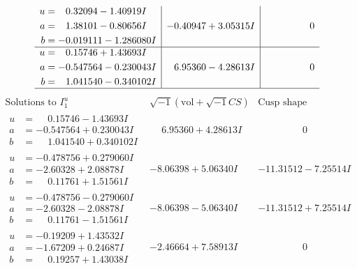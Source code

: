 \documentclass[1p]{elsarticle_modified}
\theoremstyle{definition}
\newcommand{\I}{\sqrt{-1}}
\begin{document}
$$\begin{array}{c|c|c}
\begin{aligned}
u &= \phantom{-}0.32094 - 1.40919 I \\
a &= \phantom{-}1.38101 - 0.80656 I \\
b &= -0.019111 - 1.286080 I\end{aligned}
 & -0.40947 + 3.05315 I & \phantom{-0.000000 } 0 \\ \hline\begin{aligned}
u &= \phantom{-}0.15746 + 1.43693 I \\
a &= -0.547564 - 0.230043 I \\
b &= \phantom{-}1.041540 - 0.340102 I\end{aligned}
 & \phantom{-}6.95360 - 4.28613 I & \phantom{-0.000000 } 0\\
 \hline 
 \end{array}$$\newpage$$\begin{array}{c|c|c}  
\text{Solutions to }I^u_{1}& \I (\text{vol} + \sqrt{-1}CS) & \text{Cusp shape}\\
 \hline 
\begin{aligned}
u &= \phantom{-}0.15746 - 1.43693 I \\
a &= -0.547564 + 0.230043 I \\
b &= \phantom{-}1.041540 + 0.340102 I\end{aligned}
 & \phantom{-}6.95360 + 4.28613 I & \phantom{-0.000000 } 0 \\ \hline\begin{aligned}
u &= -0.478756 + 0.279060 I \\
a &= -2.60328 + 2.08878 I \\
b &= \phantom{-}0.11761 + 1.51561 I\end{aligned}
 & -8.06398 + 5.06340 I & -11.31512 - 7.25514 I \\ \hline\begin{aligned}
u &= -0.478756 - 0.279060 I \\
a &= -2.60328 - 2.08878 I \\
b &= \phantom{-}0.11761 - 1.51561 I\end{aligned}
 & -8.06398 - 5.06340 I & -11.31512 + 7.25514 I \\ \hline\begin{aligned}
u &= -0.19209 + 1.43532 I \\
a &= -1.67209 + 0.24687 I \\
b &= \phantom{-}0.19257 + 1.43038 I\end{aligned}
 & -2.46664 + 7.58913 I & \phantom{-0.000000 } 0 \\ \hline\begin{aligned}

\end{aligned}
\end{array}$$
\end{document}
